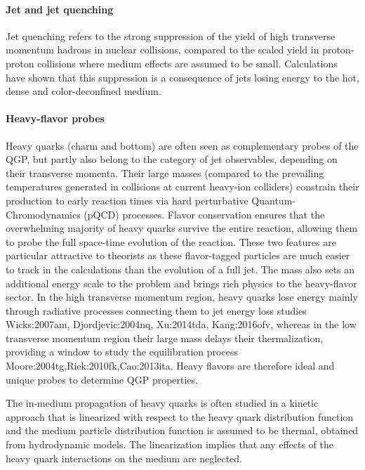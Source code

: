 \paragraph{Jet and jet quenching}
Jet quenching refers to the strong suppression of the yield of high transverse momentum hadrons in nuclear collisions, compared to the scaled yield in proton-proton collisions where medium effects are assumed to be small.
Calculations have shown that this suppression is a consequence of jets losing energy to the hot, dense and color-deconfined medium. 

\paragraph{Heavy-flavor probes}
Heavy quarks (charm and bottom) are often seen as complementary probes of the QGP, but partly also belong to the category of jet observables, depending on their transverse momenta. Their large masses (compared to the prevailing temperatures generated in collisions at current heavy-ion colliders) constrain their production to early reaction times via hard perturbative Quantum-Chromodynamics (pQCD) processes. Flavor conservation ensures that the overwhelming majority of heavy quarks survive the entire reaction, allowing them to probe the full space-time evolution of the reaction.
These two features are particular attractive to theorists as these flavor-tagged particles are much easier to track in the calculations than the evolution of a full jet.
The mass also sets an additional energy scale to the problem and brings rich physics to the heavy-flavor sector.
In the high transverse momentum region, heavy quarks lose energy mainly through radiative processes connecting them to jet energy loss studies {Wicks:2007am, Djordjevic:2004nq, Xu:2014tda, Kang:2016ofv}, whereas
in the low transverse momentum region their large mass delays their thermalization, providing a window to study the equilibration process {Moore:2004tg,Riek:2010fk,Cao:2013ita}.
Heavy flavors are therefore ideal and unique probes to determine QGP properties.

The in-medium propagation of heavy quarks is often studied in a kinetic approach that is linearized with respect to the heavy quark distribution function and the medium particle distribution function is assumed to be thermal, obtained from hydrodynamic models.
The linearization implies that any effects of the heavy quark interactions on the medium are neglected.

